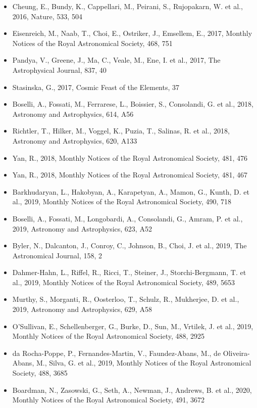 \documentclass{letter}
\begin{document}
\begin{enumerate}
\begin{itemize}
\item Cheung, E., Bundy, K., Cappellari, M., Peirani, S., Rujopakarn, W. et al., 2016, Nature, 533, 504
\item Eisenreich, M., Naab, T., Choi, E., Ostriker, J., Emsellem, E., 2017, Monthly Notices of the Royal Astronomical Society, 468, 751
\item Pandya, V., Greene, J., Ma, C., Veale, M., Ene, I. et al., 2017, The Astrophysical Journal, 837, 40
\item Stasinska, G., 2017, Cosmic Feast of the Elements, 37
\item Boselli, A., Fossati, M., Ferrarese, L., Boissier, S., Consolandi, G. et al., 2018, Astronomy and Astrophysics, 614, A56
\item Richtler, T., Hilker, M., Voggel, K., Puzia, T., Salinas, R. et al., 2018, Astronomy and Astrophysics, 620, A133
\item Yan, R., 2018, Monthly Notices of the Royal Astronomical Society, 481, 476
\item Yan, R., 2018, Monthly Notices of the Royal Astronomical Society, 481, 467
\item Barkhudaryan, L., Hakobyan, A., Karapetyan, A., Mamon, G., Kunth, D. et al., 2019, Monthly Notices of the Royal Astronomical Society, 490, 718
\item Boselli, A., Fossati, M., Longobardi, A., Consolandi, G., Amram, P. et al., 2019, Astronomy and Astrophysics, 623, A52
\item Byler, N., Dalcanton, J., Conroy, C., Johnson, B., Choi, J. et al., 2019, The Astronomical Journal, 158, 2
\item Dahmer-Hahn, L., Riffel, R., Ricci, T., Steiner, J., Storchi-Bergmann, T. et al., 2019, Monthly Notices of the Royal Astronomical Society, 489, 5653
\item Murthy, S., Morganti, R., Oosterloo, T., Schulz, R., Mukherjee, D. et al., 2019, Astronomy and Astrophysics, 629, A58
\item O'Sullivan, E., Schellenberger, G., Burke, D., Sun, M., Vrtilek, J. et al., 2019, Monthly Notices of the Royal Astronomical Society, 488, 2925
\item da Rocha-Poppe, P., Fernandes-Martin, V., Faundez-Abans, M., de Oliveira-Abans, M., Silva, G. et al., 2019, Monthly Notices of the Royal Astronomical Society, 488, 3685
\item Boardman, N., Zasowski, G., Seth, A., Newman, J., Andrews, B. et al., 2020, Monthly Notices of the Royal Astronomical Society, 491, 3672

\end{itemize}
\end{enumerate}
\end{document}
